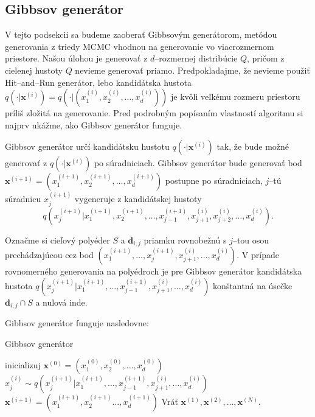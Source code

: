 \subsection{Gibbsov generátor}

V tejto podsekcii sa budeme zaoberať Gibbsovým generátorom, metódou generovania z triedy MCMC vhodnou na generovanie vo viacrozmernom priestore.
Našou úlohou je generovať z $d$--rozmernej distribúcie $Q$, pričom z cielenej hustoty $Q$ nevieme generovať priamo. Predpokladajme, že nevieme použiť Hit--and--Run generátor, lebo kandidátska hustota $q(\cdot| \mathbf x^{(i)})=q(\cdot|(x^{(i)}_1, x^{(i)}_2, \dots, x^{(i)}_d))$ je kvôli veľkému rozmeru priestoru príliš zložitá na generovanie. Pred podrobným popísaním vlastností algoritmu si najprv ukážme, ako Gibbsov generátor funguje.

Gibbsov generátor určí kandidátsku hustotu $q(\cdot|\mathbf x^{(i)})$ tak, že bude možné generovať z $q(\cdot|\mathbf x^{(i)})$ po súradniciach.
Gibbsov generátor bude generovať bod $\mathbf x^{(i+1)}=(x^{(i+1)}_1, x^{(i+1)}_2, \dots, x^{(i+1)}_d)$ postupne po súradniciach, $j$--tú súradnicu $x^{(i+1)}_j$ vygeneruje z kandidátskej hustoty $$q(x^{(i+1)}_j|x^{(i+1)}_1, x^{(i+1)}_2, \dots, x^{(i+1)}_{j-1}, x^{(i)}_{j+1}, x^{(i)}_{j+2}, \dots, x^{(i)}_d).$$

Označme si cieľový polyéder $S$ a $\mathbf d_{i,j}$ priamku rovnobežnú s $j$--tou osou prechádzajúcou cez bod $(x^{(i+1)}_1, \dots, x^{(i+1)}_{j}, x^{(i)}_{j+1}, \dots, x^{(i)}_d)$.
V prípade rovnomerného generovania na polyédroch je pre Gibbsov generátor kandidátska hustota $q(x^{(i+1)}_j|x^{(i+1)}_1, \dots, x^{(i+1)}_{j-1}, x^{(i)}_{j+1}, \dots, x^{(i)}_d)$ konštantná na úsečke $\mathbf d_{i,j} \cap S$ a nulová inde.

Gibbsov generátor funguje nasledovne:

\begin{algorithm}[H]
	\caption{Gibbsov generátor \cite{mcmc_intro_mackay}}
	\label{gibbs}
	\begin{algorithmic}[1]
		\State inicializuj $\mathbf x^{(0)} = (x^{(0)}_1, x^{(0)}_2, \dots, x^{(0)}_d)$
				\State $x^{(i)}_j \sim q(x^{(i+1)}_j|x^{(i+1)}_1, \dots, x^{(i+1)}_{j-1}, x^{(i)}_{j+1}, \dots, x^{(i)}_d)$
			\EndFor
			\State $\mathbf x^{(i+1)}= (x^{(i+1)}_1, x^{(i+1)}_2 \dots, x^{(i+1)}_d)$
		\EndFor
		\State Vráť ${\mathbf x^{(1)},\mathbf x^{(2)},\dots,\mathbf x^{(N)}}$.
	\end{algorithmic}
\end{algorithm}


